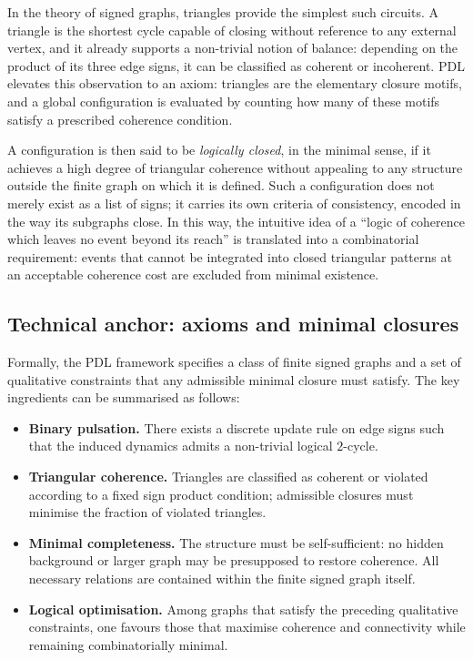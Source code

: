 \documentclass[11pt,a4paper]{article}
\theoremstyle{definition}
\begin{document}
In the theory of signed graphs, triangles provide the simplest such circuits. A triangle is the shortest cycle capable of closing without reference to any external vertex, and it already supports a non-trivial notion of balance: depending on the product of its three edge signs, it can be classified as coherent or incoherent.\cite{Laubscher_EmergencePhysicalReality_2024,Laubscher_Leakage_Probability_2024} PDL elevates this observation to an axiom: triangles are the elementary closure motifs, and a global configuration is evaluated by counting how many of these motifs satisfy a prescribed coherence condition.

A configuration is then said to be \emph{logically closed}, in the minimal sense, if it achieves a high degree of triangular coherence without appealing to any structure outside the finite graph on which it is defined.\cite{Laubscher_EmergencePhysicalReality_2024,Laubscher_MinimalClosures_46_2024} Such a configuration does not merely exist as a list of signs; it carries its own criteria of consistency, encoded in the way its subgraphs close. In this way, the intuitive idea of a ``logic of coherence which leaves no event beyond its reach'' is translated into a combinatorial requirement: events that cannot be integrated into closed triangular patterns at an acceptable coherence cost are excluded from minimal existence.

\subsection{Technical anchor: axioms and minimal closures}

Formally, the PDL framework specifies a class of finite signed graphs and a set of qualitative constraints that any admissible minimal closure must satisfy.\cite{Laubscher_IntroPDL_2024,Laubscher_EmergencePhysicalReality_2024,Laubscher_MinimalClosures_46_2024,Laubscher_PDL_Position_2024} The key ingredients can be summarised as follows:

\begin{itemize}
  \item \textbf{Binary pulsation.} There exists a discrete update rule on edge signs such that the induced dynamics admits a non-trivial logical \(2\)-cycle.
  \item \textbf{Triangular coherence.} Triangles are classified as coherent or violated according to a fixed sign product condition; admissible closures must minimise the fraction of violated triangles.
  \item \textbf{Minimal completeness.} The structure must be self-sufficient: no hidden background or larger graph may be presupposed to restore coherence. All necessary relations are contained within the finite signed graph itself.
  \item \textbf{Logical optimisation.} Among graphs that satisfy the preceding qualitative constraints, one favours those that maximise coherence and connectivity while remaining combinatorially minimal.
\end{itemize}
\end{document}
